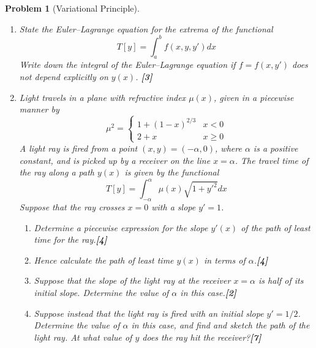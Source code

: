 \documentclass[a4paper]{article}
\theoremstyle{new}
\newtheorem{qns}{Problem}[section]
\begin{document}
\begin{qns}[Variational Principle]\leavevmode
\begin{enumerate}[label=(\alph*)]
\item State the Euler–Lagrange equation for the extrema of the functional
$$T[y]=\int_a^bf(x,y,y')dx$$
Write down the integral of the Euler–Lagrange equation if $f = f(x, y')$ does not depend explicitly on $y(x)$. \hfill\textbf{[3]}
\item Light travels in a plane with refractive index $\mu(x)$, given in a piecewise manner by
$$\mu^2=
\left\{
        \begin{array}{ll}
      1+(1-x)^{2/3} & x<0 \\
      2+x & x\geq0 
        \end{array}
    \right.$$
A light ray is fired from a point $(x, y) = (−\alpha, 0)$, where $\alpha$ is a positive constant, and is picked up by a receiver on the line $x = \alpha$. The travel time of the ray along a path $y(x)$ is given by the functional
$$T[y]=\int_{-\alpha}^\alpha\mu(x)\sqrt{1+y'^2}dx$$
Suppose that the ray crosses $x = 0$ with a slope $y' = 1$.
\begin{enumerate}[label=(\roman*)]
\item Determine a piecewise expression for the slope $y'(x)$ of the path of least time for the ray.\hfill\textbf{[4]}
\item Hence calculate the path of least time $y(x)$ in terms of $\alpha$.\hfill\textbf{[4]}
\item Suppose that the slope of the light ray at the receiver $x = \alpha$ is half of its initial slope. Determine the value of $\alpha$ in this case.\hfill\textbf{[2]}
\item Suppose instead that the light ray is fired with an initial slope $y' = 1/2$. Determine the value of $\alpha$ in this case, and find and sketch the path of the light ray. At what value of $y$ does the ray hit the receiver?\hfill\textbf{[7]}
\end{enumerate}
\end{enumerate}
\end{qns}
\end{document}
